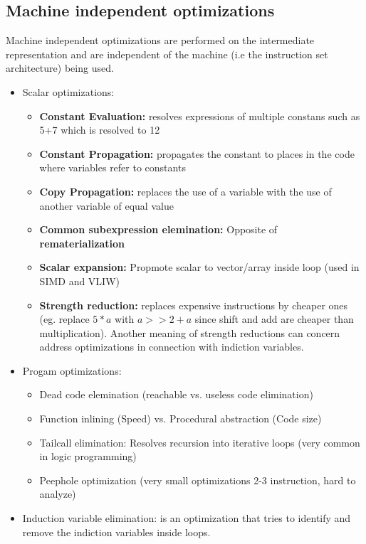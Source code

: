 \documentclass[a4paper,10pt]{article}
\begin{document}
\subsection{Machine independent optimizations}
Machine independent optimizations are performed on the intermediate representation and are independent of the machine (i.e the instruction
set architecture) being used.
\begin{itemize}
 \item Scalar optimizations:
 \begin{itemize}
     \item \textbf{Constant Evaluation:} resolves expressions of multiple constans such as 5+7 which is resolved to 12
     \item \textbf{Constant Propagation:} propagates the constant to places in the code where variables refer to constants
     \item \textbf{Copy Propagation:} replaces the use of a variable with the use of another variable of equal value
     \item \textbf{Common subexpression elemination:} Opposite of \textbf{rematerialization}
     \item \textbf{Scalar expansion:} Propmote scalar to vector/array inside loop (used in SIMD and VLIW)
     \item \textbf{Strength reduction:} replaces expensive instructions by cheaper ones (eg. replace $5*a$ with $a>>2+a$ since shift and add are cheaper than multiplication). Another meaning of strength reductions can concern address optimizations in connection with indiction variables.
 \end{itemize}
 \item Progam optimizations:
 \begin{itemize}
     \item Dead code elemination (reachable vs. useless code elimination)
     \item Function inlining (Speed) vs. Procedural abstraction (Code size)
     \item Tailcall elimination: Resolves recursion into iterative loops (very common in logic programming)
     \item Peephole optimization (very small optimizations 2-3 instruction, hard to analyze)
 \end{itemize}
 \item Induction variable elimination: is an optimization that tries to identify and remove the indiction variables inside loops.
  \begin{itemize}

\end{itemize}
\end{itemize}
\end{document}
